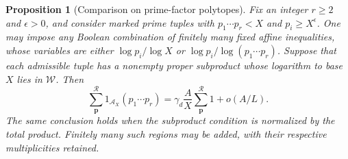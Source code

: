 \documentclass[11pt,a4paper]{article}
\theoremstyle{paperplain}
\newtheorem{proposition}[theorem]{Proposition}
\numberwithin{equation}{section}
\begin{document}
\begin{proposition}[Comparison on prime-factor polytopes]\label{arith:polytope}
Fix an integer $r\ge2$ and $\epsilon>0$, and consider marked prime tuples with
$p_1\cdots p_r<X$ and $p_i\ge X^\epsilon$.
One may impose any Boolean combination of finitely many fixed affine
inequalities, whose variables are either $\log p_i/\log X$ or
$\log p_i/\log(p_1\cdots p_r)$.
Suppose that each admissible tuple has a nonempty proper subproduct
whose logarithm to base $X$ lies in $\mathcal W$. Then
\begin{equation}\label{arith:polytopeformula}
 \sum_{\boldsymbol p}^{\mathcal R}
       1_{\mathcal A_X}(p_1\cdots p_r)
 =\gamma_d\frac AX\sum_{\boldsymbol p}^{\mathcal R}1
       +o(A/L).
\end{equation}
The same conclusion holds when the subproduct condition is normalized
by the total product. Finitely many such regions may be added, with
their respective multiplicities retained.
\end{proposition}
\end{document}
